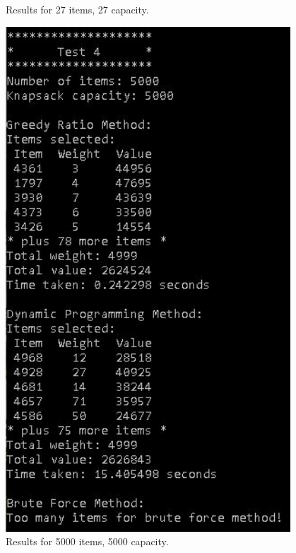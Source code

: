 \documentclass{article}
\begin{document}
\begin{figure}[H]
\begin{minipage}{0.49\textwidth}
        \caption{Results for 27 items, 27 capacity.}
    \end{minipage}\hfill
    \begin{minipage}{0.49\textwidth}
        \centering
        \includegraphics[width=0.95\textwidth]{test4.JPG}
        \caption{Results for 5000 items, 5000 capacity.}
    \end{minipage}\hfill
\end{figure}
\end{document}
